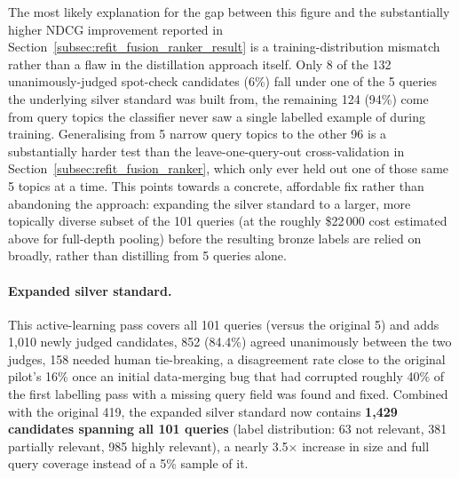 \documentclass[a4paper,oneside,bibliography=totoc]{scrbook}
\begin{document}
The most likely explanation for the gap between this figure and the substantially higher NDCG improvement reported in Section~\ref{subsec:refit_fusion_ranker_result} is a training-distribution mismatch rather than a flaw in the distillation approach itself. Only 8 of the 132 unanimously-judged spot-check candidates (6\%) fall under one of the 5 queries the underlying silver standard was built from, the remaining 124 (94\%) come from query topics the classifier never saw a single labelled example of during training. Generalising from 5 narrow query topics to the other 96 is a substantially harder test than the leave-one-query-out cross-validation in Section~\ref{subsec:refit_fusion_ranker}, which only ever held out one of those same 5 topics at a time. This points towards a concrete, affordable fix rather than abandoning the approach: expanding the silver standard to a larger, more topically diverse subset of the 101 queries (at the roughly \$22\,000 cost estimated above for full-depth pooling) before the resulting bronze labels are relied on broadly, rather than distilling from 5 queries alone.

\label{subsec:active_learning_result}

\paragraph{Expanded silver standard.} This active-learning pass covers all 101 queries (versus the original 5) and adds 1{,}010 newly judged candidates, 852 (84.4\%) agreed unanimously between the two judges, 158 needed human tie-breaking, a disagreement rate close to the original pilot's 16\% once an initial data-merging bug that had corrupted roughly 40\% of the first labelling pass with a missing query field was found and fixed. Combined with the original 419, the expanded silver standard now contains \textbf{1{,}429 candidates spanning all 101 queries} (label distribution: 63 not relevant, 381 partially relevant, 985 highly relevant), a nearly 3.5$\times$ increase in size and full query coverage instead of a 5\% sample of it.
\end{document}
